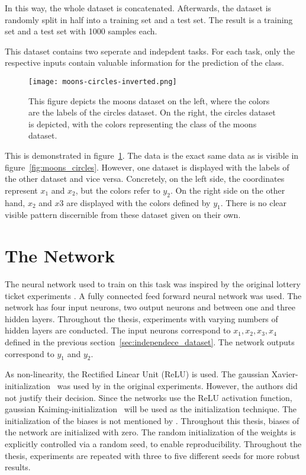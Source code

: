 In this way, the whole dataset is concatenated.
Afterwards, the dataset is randomly split in half into a training set and a test set.
The result is a training set and a test set with 1000 samples each.

This dataset contains two seperate and indepdent tasks.
For each task, only the respective inputs contain valuable information for the prediction of the class.

\begin{figure}[ht]
    \centering
    \texttt{[image: moons-circles-inverted.png]}
    \caption{
        This figure depicts the moons dataset on the left, where the colors are the labels of the circles dataset.
        On the right, the circles dataset is depicted, with the colors representing the class of the moons dataset.
    }\label{fig:moons_circles_inverted}
\end{figure}

This is demonstrated in figure~\ref{fig:moons_circles_inverted}.
The data is the exact same data as is visible in figure~\ref{fig:moons_circles}. 
However, one dataset is displayed with the labels of the other dataset and vice versa.
Concretely, on the left side, the coordinates represent $x_1$ and $x_2$, but the colors refer to $y_2$.
On the right side on the other hand, $x_2$ and $x3$ are displayed with the colors defined by $y_1$.
There is no clear visible pattern discernible from these dataset given on their own.


\section{The Network}
The neural network used to train on this task was inspired by the original lottery ticket experiments \autocite{DBLP:conf/iclr/FrankleC19}. 
A fully connected feed forward neural network was used.
The network has four input neurons, two output neurons and between one and three hidden layers.
Throughout the thesis, experiments with varying numbers of hidden layers are conducted.
The input neurons correspond to $x_1, x_2, x_3, x_4$ defined in the previous section~\ref{sec:independece_dataset}.
The network outputs correspond to $y_1$ and $y_2$.

As non-linearity, the Rectified Linear Unit (ReLU) is used.
The gaussian Xavier-initialization~\textcite{XAVIER-GLOROT} was used by \textcite{DBLP:conf/iclr/FrankleC19} in the original experiments.
However, the authors did not justify their decision.
Since the networks use the ReLU activation function, gaussian Kaiming-initialization~\autocite{KAIMING-HE} will be used as the initialization technique.
The initialization of the biases is not mentioned by \textcite{DBLP:conf/iclr/FrankleC19}.
Throughout this thesis, biases of the network are initialized with zero.
The random initialization of the weights is explicitly controlled via a random seed, to enable reproducibility.
Throughout the thesis, experiments are repeated with three to five different seeds for more robust results.

